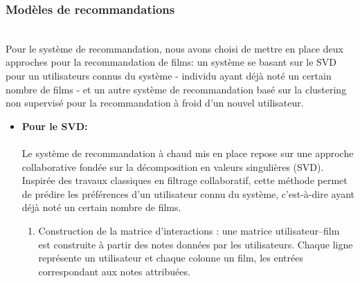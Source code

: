 \documentclass{article}
\begin{document}
\subsubsection{Modèles de recommandations}
$ $\\
Pour le système de recommandation, nous avons choisi de mettre en place deux approches pour la recommandation de films: un système se basant sur le SVD pour un
utilisateurs connus du système - individu ayant déjà noté un certain nombre de films - et un autre système de recommandation basé sur la clustering non supervisé
pour la recommandation à froid d’un nouvel utilisateur.\\
\begin{itemize}
    \item \textbf{Pour le SVD:} \\
          $ $\\
          Le système de recommandation à chaud mis en place repose sur une approche collaborative fondée sur la décomposition en valeurs singulières (SVD).
          Inspirée des travaux classiques en filtrage collaboratif, cette méthode permet de prédire les préférences d’un utilisateur connu du système, c’est-à-dire ayant déjà noté un certain nombre de films.

          \begin{enumerate}
              \item Construction de la matrice d’interactions : une matrice utilisateur–film est construite à partir des notes données par les utilisateurs.
                    Chaque ligne représente un utilisateur et chaque colonne un film, les entrées correspondant aux notes attribuées.


\end{enumerate}
\end{itemize}
\end{document}
